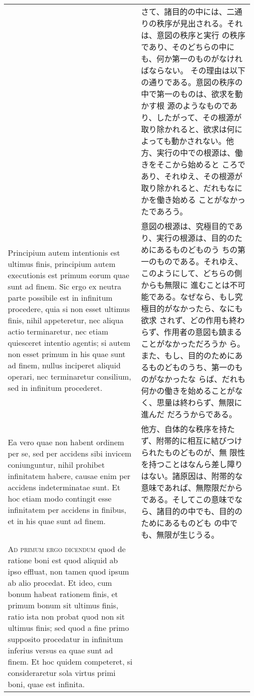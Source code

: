 \documentclass[10pt]{jsarticle} %
\begin{document}
\begin{longtable}{p{21em}p{21em}}
&

さて、諸目的の中には、二通りの秩序が見出される。それは、意図の秩序と実行
 の秩序であり、そのどちらの中にも、何か第一のものがなければならない。
その理由は以下の通りである。意図の秩序の中で第一のものは、欲求を動かす根
 源のようなものであり、したがって、その根源が取り除かれると、欲求は何に
 よっても動かされない。他方、実行の中での根源は、働きをそこから始めると
 ころであり、それゆえ、その根源が取り除かれると、だれもなにかを働き始める
 ことがなかったであろう。


\\


Principium autem intentionis est ultimus finis,
principium autem executionis est primum eorum quae sunt ad finem. Sic
ergo ex neutra parte possibile est in infinitum procedere, quia si non
esset ultimus finis, nihil appeteretur, nec aliqua actio terminaretur,
nec etiam quiesceret intentio agentis; si autem non esset primum in his
quae sunt ad finem, nullus inciperet aliquid operari, nec terminaretur
consilium, sed in infinitum procederet. 



&

意図の根源は、究極目的であり、実行の根源は、目的のためにあるものどものう
 ちの第一のものである。それゆえ、このようにして、どちらの側からも無限に
 進むことは不可能である。なぜなら、もし究極目的がなかったら、なにも欲求
 されず、どの作用も終わらず、作用者の意図も鎮まることがなかっただろうか
 ら。また、もし、目的のためにあるものどものうち、第一のものがなかったな
 らば、だれも何かの働きを始めることがなく、思量は終わらず、無限に進んだ
 だろうからである。



\\



Ea vero quae non habent ordinem
per se, sed per accidens sibi invicem coniunguntur, nihil prohibet
infinitatem habere, causae enim per accidens indeterminatae sunt. Et hoc
etiam modo contingit esse infinitatem per accidens in finibus, et in his
quae sunt ad finem.

&

他方、自体的な秩序を持たず、附帯的に相互に結びつけられたものどものが、無
 限性を持つことはなんら差し障りはない。諸原因は、附帯的な意味であれば、無際限だから
 である。そしてこの意味でなら、諸目的の中でも、目的のためにあるものども
 の中でも、無限が生じうる。


\\


{\scshape Ad primum ergo dicendum} quod de ratione
boni est quod aliquid ab ipso effluat, non tamen quod ipsum ab alio
procedat. Et ideo, cum bonum habeat rationem finis, et primum bonum sit
ultimus finis, ratio ista non probat quod non sit ultimus finis; sed
quod a fine primo supposito procedatur in infinitum inferius versus ea
quae sunt ad finem. Et hoc quidem competeret, si consideraretur sola
virtus primi boni, quae est infinita. 


\end{longtable}
\end{document}

